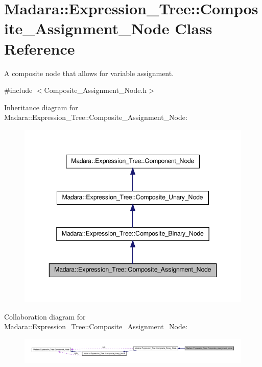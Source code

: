 \hypertarget{classMadara_1_1Expression__Tree_1_1Composite__Assignment__Node}{
\section{Madara::Expression\_\-Tree::Composite\_\-Assignment\_\-Node Class Reference}
\label{d7/d8b/classMadara_1_1Expression__Tree_1_1Composite__Assignment__Node}
}


A composite node that allows for variable assignment.  




{\ttfamily \#include $<$Composite\_\-Assignment\_\-Node.h$>$}



Inheritance diagram for Madara::Expression\_\-Tree::Composite\_\-Assignment\_\-Node:
\nopagebreak
\begin{figure}[H]
\begin{center}
\leavevmode
\includegraphics[width=346pt]{d8/d44/classMadara_1_1Expression__Tree_1_1Composite__Assignment__Node__inherit__graph}
\end{center}
\end{figure}


Collaboration diagram for Madara::Expression\_\-Tree::Composite\_\-Assignment\_\-Node:
\nopagebreak
\begin{figure}[H]
\begin{center}
\leavevmode
\includegraphics[width=400pt]{df/d30/classMadara_1_1Expression__Tree_1_1Composite__Assignment__Node__coll__graph}
\end{center}
\end{figure}
